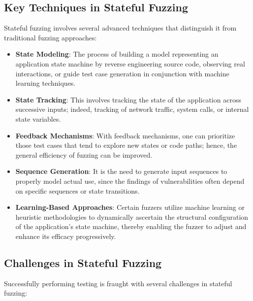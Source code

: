 \subsection{Key Techniques in Stateful Fuzzing}
Stateful fuzzing involves several advanced techniques that distinguish it from traditional fuzzing approaches:

\begin{itemize}
    \item \textbf{State Modeling}: The process of building a model representing an application state machine by reverse engineering source code, observing real interactions, or guide test case generation in conjunction with machine learning techniques.
    
    \item \textbf{State Tracking}: This involves tracking the state of the application across successive inputs; indeed, tracking of network traffic, system calls, or internal state variables.
    
    \item \textbf{Feedback Mechanisms}: With feedback mechanisms, one can prioritize those test cases that tend to explore new states or code paths; hence, the general efficiency of fuzzing can be improved.
    
    \item \textbf{Sequence Generation}: It is the need to generate input sequences to properly model actual use, since the findings of vulnerabilities often depend on specific sequences or state transitions.
    
    \item \textbf{Learning-Based Approaches}: Certain fuzzers utilize machine learning or heuristic methodologies to dynamically ascertain the structural configuration of the application's state machine, thereby enabling the fuzzer to adjust and enhance its efficacy progressively.
\end{itemize}

\subsection{Challenges in Stateful Fuzzing}
Successfully performing testing is fraught with several challenges in stateful fuzzing:

